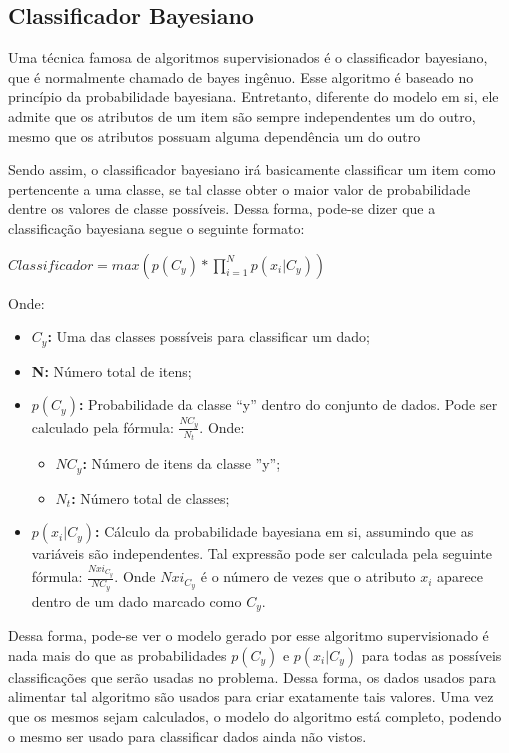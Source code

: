 \subsection{Classificador Bayesiano} \label{sec:classificador_bayesiano}

Uma técnica famosa de algoritmos supervisionados é o classificador bayesiano,
que é normalmente chamado de bayes ingênuo. Esse algoritmo é baseado no
princípio da probabilidade bayesiana. Entretanto, diferente do modelo em si,
ele admite que os atributos de um item são sempre independentes um do outro,
mesmo que os atributos possuam alguma dependência um do outro \cite{segaran2007programming}

Sendo assim, o classificador bayesiano irá basicamente classificar um item
como pertencente a uma classe, se tal classe obter o maior valor de
probabilidade dentre os valores de classe possíveis. Dessa forma, pode-se
dizer que a classificação bayesiana segue o seguinte formato:

$Classificador = max(p(C_{y})*\prod_{i=1}^{N}p(x_{i}|C_{y}))$

Onde:

\begin{itemize}
    \item \textbf{$C_{y}$: } Uma das classes possíveis para classificar um
    dado;
    \item \textbf{N: } Número total de itens;
    \item \textbf{$p(C_{y})$: } Probabilidade da classe ``y'' dentro do
    conjunto de dados. Pode ser calculado pela
    fórmula: $\frac{NC_{y}}{N_{t}}$.
    Onde:
      \begin{itemize}
          \item \textbf{$NC_{y}$: } Número de itens da classe ''y'';
          \item \textbf{$N_{t}$: } Número total de classes;
      \end{itemize}
    \item \textbf{$p(x_{i}|C_{y})$: } Cálculo da probabilidade bayesiana
    em si, assumindo que as variáveis são independentes. Tal expressão
    pode ser calculada pela seguinte fórmula: $\frac{Nxi_{C_{y}}}{NC_{y}}$.
    Onde $Nxi_{C_{y}}$ é o número de vezes que o atributo $x_{i}$ aparece
    dentro de um dado marcado como $C_{y}$.
\end{itemize}

Dessa forma, pode-se ver o modelo gerado por esse algoritmo supervisionado
é nada mais do que as probabilidades $p(C_{y})$ e $p(x_{i}|C_{y})$ para
todas as possíveis classificações que serão usadas no problema. Dessa forma,
os dados usados para alimentar tal algoritmo são usados para criar exatamente tais
valores. Uma vez que os mesmos sejam calculados, o modelo do algoritmo está completo,
podendo o mesmo ser usado para classificar dados ainda não vistos.

